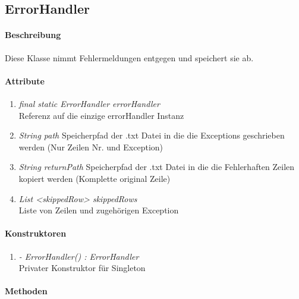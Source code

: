 \subsection{ErrorHandler}

\paragraph{Beschreibung}
Diese Klasse nimmt Fehlermeldungen entgegen und speichert sie ab.

\paragraph{Attribute}

\begin{enumerate}[$\bullet$]
	\item \textit{final static ErrorHandler errorHandler} \\Referenz auf die einzige errorHandler Instanz
	\item \textit{String path} Speicherpfad der .txt Datei in die die Exceptions geschrieben werden (Nur Zeilen Nr. und Exception)
	\item \textit{String returnPath} Speicherpfad der .txt Datei in die die Fehlerhaften Zeilen kopiert werden (Komplette original Zeile)
	\item \textit{List <skippedRow> skippedRows} \\ Liste von Zeilen und zugehörigen Exception
\end{enumerate}

\paragraph{Konstruktoren}
\begin{enumerate}[+]
	\item \textit{ - ErrorHandler() : ErrorHandler}  \\Privater Konstruktor für Singleton
\end{enumerate}

\paragraph{Methoden}

